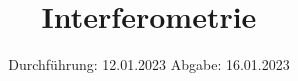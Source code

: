 

\subject{V 64}
\title{Interferometrie}
\date{%
  Durchführung: 12.01.2023
  \hspace{3em}
  Abgabe: 16.01.2023
}



\maketitle
\thispagestyle{empty}
\tableofcontents
\newpage







\printbibliography{}


